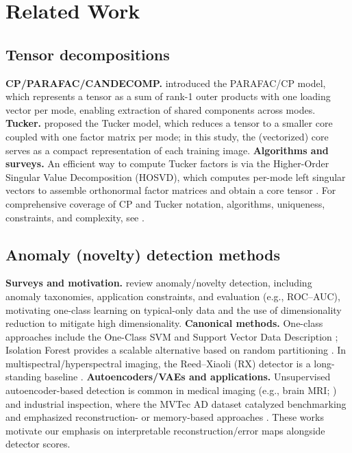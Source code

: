 \documentclass[11pt]{article}
\begin{document}
\section{Related Work}

\subsection{Tensor decompositions}

\textbf{CP/PARAFAC/CANDECOMP.} \citet{Harshman1970} introduced the PARAFAC/CP model, which represents a tensor as a sum of rank-1 outer products with one loading vector per mode, enabling extraction of shared components across modes. 
\textbf{Tucker.} \citet{Tucker1966} proposed the Tucker model, which reduces a tensor to a smaller core coupled with one factor matrix per mode; in this study, the (vectorized) core serves as a compact representation of each training image. 
\textbf{Algorithms and surveys.} An efficient way to compute Tucker factors is via the Higher-Order Singular Value Decomposition (HOSVD), which computes per-mode left singular vectors to assemble orthonormal factor matrices and obtain a core tensor \citep{DeLathauwer2000a}. For comprehensive coverage of CP and Tucker notation, algorithms, uniqueness, constraints, and complexity, see \citet{KoldaBader2009}.

\subsection{Anomaly (novelty) detection methods}
\textbf{Surveys and motivation.} \citet{Chandola2009,Pimentel2014} review anomaly/novelty detection, including anomaly taxonomies, application constraints, and evaluation (e.g., ROC–AUC), motivating one-class learning on typical-only data and the use of dimensionality reduction to mitigate high dimensionality.
\textbf{Canonical methods.} One-class approaches include the One-Class SVM \citep{Scholkopf2001} and Support Vector Data Description \citep{TaxDuin2004}; Isolation Forest provides a scalable alternative based on random partitioning \citep{Liu2008,Liu2012}. In multispectral/hyperspectral imaging, the Reed–Xiaoli (RX) detector is a long-standing baseline \citep{ReedYu1990}. 
\textbf{Autoencoders/VAEs and applications.} Unsupervised autoencoder-based detection is common in medical imaging (e.g., brain MRI; \citep{Baur2021}) and industrial inspection, where the MVTec AD dataset catalyzed benchmarking and emphasized reconstruction- or memory-based approaches \citep{Bergmann2019,Bergmann2021}. These works motivate our emphasis on interpretable reconstruction/error maps alongside detector scores.
\end{document}
